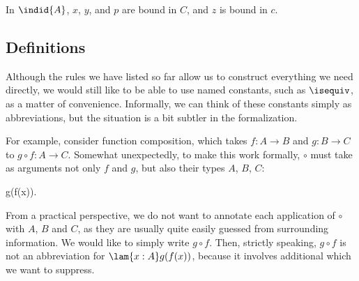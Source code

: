 %
In $\indid{A}$, $x$, $y$, and $p$ are bound in $C$, and $z$ is bound in
$c$.

%

\subsection{Definitions}

%

Although the rules we have listed so far allow us to construct everything we need directly, we
would still like to be able to use named constants, such as $\isequiv$, as a matter of
convenience. Informally, we can think of these constants simply as
abbreviations, but the situation is a bit subtler in the formalization.

For example, consider function composition, which takes $f:A\to B$ and
$g:B\to C$ to $g\circ f:A\to C$. Somewhat unexpectedly, to make this work formally, $\circ$ must take as arguments not only $f$ and $g$, but also their types $A$, $B$, $C$:
%
\begin{narrowmultline*}
  {\circ}  {}
  \narrowbreak
   g(f(x)).
\end{narrowmultline*}
%
From a practical perspective, we do not want to annotate each application of
$\circ$ with $A$, $B$ and $C$, as they are usually quite easily guessed from surrounding information. We would like to simply write $g\circ f$.
Then, strictly speaking, $g \circ f$ is not an abbreviation for $\lam{x : A} g(f(x))$,
because it involves additional  which we want to suppress.

